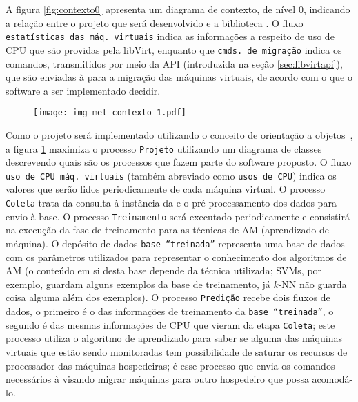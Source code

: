 A figura \ref{fig:contexto0} apresenta um diagrama de contexto, de nível 0,
indicando a relação entre o projeto que será desenvolvido e a biblioteca
\libvirt{}. O fluxo \texttt{estatísticas das máq. virtuais} indica as
informações a respeito de uso de CPU que são providas pela libVirt,
enquanto que \texttt{cmds. de migração} indica os comandos, transmitidos
por meio da API (introduzida na seção \ref{sec:libvirtapi}), que são enviadas
à \libvirt{} para a migração das máquinas virtuais, de acordo com o que o
software a ser implementado decidir.

\begin{figure}[htp]
\centering
\texttt{[image: img-met-contexto-1.pdf]}
\label{fig:contexto1}
\end{figure}

Como o projeto será implementado utilizando o conceito de orientação a
objetos~\cite{ricarte2001programacao}, a figura \ref{fig:contexto1} maximiza o
processo \texttt{Projeto} utilizando um diagrama de
classes~\cite{bezerra2002principios} descrevendo quais são os processos que
fazem parte do software proposto. O fluxo \texttt{uso de CPU máq. virtuais}
(também abreviado como \texttt{usos de CPU}) indica os valores que serão lidos
periodicamente de cada máquina virtual.  O processo \texttt{Coleta} trata da
consulta à instância da \libvirt{} e o pré-processamento dos dados para envio à
base. O processo \texttt{Treinamento} será executado periodicamente e
consistirá na execução da fase de treinamento para as técnicas de AM
(aprendizado de máquina). O depósito de dados \texttt{base ``treinada''}
representa uma base de dados com os parâmetros utilizados para representar o
conhecimento dos algoritmos de AM (o conteúdo em si desta base depende
da técnica utilizada; SVMs, por exemplo, guardam alguns exemplos da base de
treinamento, já $k$-NN não guarda coisa alguma além dos exemplos). O processo
\texttt{Predição} recebe dois fluxos de dados, o primeiro é o das informações
de treinamento da \texttt{base ``treinada''}, o segundo é das mesmas
informações de CPU que vieram da etapa \texttt{Coleta}; este processo utiliza o
algoritmo de aprendizado para saber se alguma das máquinas virtuais que estão
sendo monitoradas tem possibilidade de saturar os recursos de processador das
máquinas hospedeiras; é esse processo que envia os comandos necessários à
\libvirt{} visando migrar máquinas para outro hospedeiro que possa acomodá-lo.



